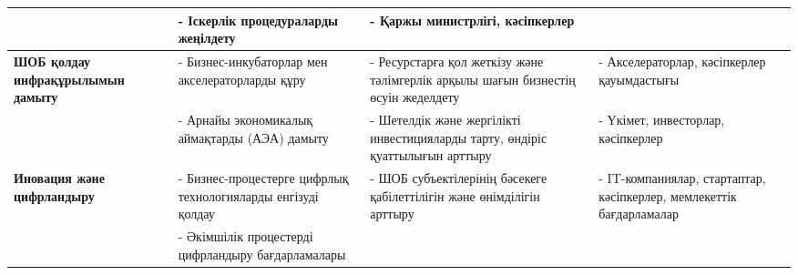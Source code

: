 \begin{table}[H]
\begin{tabular}{|p{}|p{}|p{}|p{}|}
        & \begin{minipage}{0.3\textwidth} - Іскерлік процедураларды жеңілдету \end{minipage} 
        & \begin{minipage}{0.2\textwidth} - Қаржы министрлігі, кәсіпкерлер \end{minipage} \\ 
        \hline
        \multirow{2}{=}{\textbf{ШОБ қолдау инфрақұрылымын дамыту}}  
        & \begin{minipage}{0.2\textwidth} - Бизнес-инкубаторлар мен акселераторларды құру \end{minipage} 
        & \begin{minipage}{0.3\textwidth} - Ресурстарға қол жеткізу және тәлімгерлік арқылы шағын бизнестің өсуін жеделдету \end{minipage} 
        & \begin{minipage}{0.2\textwidth} - Акселераторлар, кәсіпкерлер қауымдастығы \end{minipage} \\ 
        \cline{2-4}  
        & \begin{minipage}{0.2\textwidth} - Арнайы экономикалық аймақтарды (АЭА) дамыту \end{minipage} 
        & \begin{minipage}{0.3\textwidth} - Шетелдік және жергілікті инвестицияларды тарту, өндіріс қуаттылығын арттыру \end{minipage} 
        & \begin{minipage}{0.2\textwidth} - Үкімет, инвесторлар, кәсіпкерлер \end{minipage} \\ 
        \hline
        \multirow{3}{=}{\textbf{Иновация және цифрландыру}}  
        & \begin{minipage}{0.2\textwidth} - Бизнес-процестерге цифрлық технологияларды енгізуді қолдау \end{minipage} 
        & \begin{minipage}{0.3\textwidth} - ШОБ субъектілерінің бәсекеге қабілеттілігін және өнімділігін арттыру \end{minipage} 
        & \begin{minipage}{0.2\textwidth} - IT-компаниялар, стартаптар, кәсіпкерлер, мемлекеттік бағдарламалар \end{minipage} \\ 
        \cline{2-4}  
        & \begin{minipage}{0.2\textwidth} - Әкімшілік процестерді цифрландыру бағдарламалары \end{minipage} 

\end{tabular}
\end{table}

